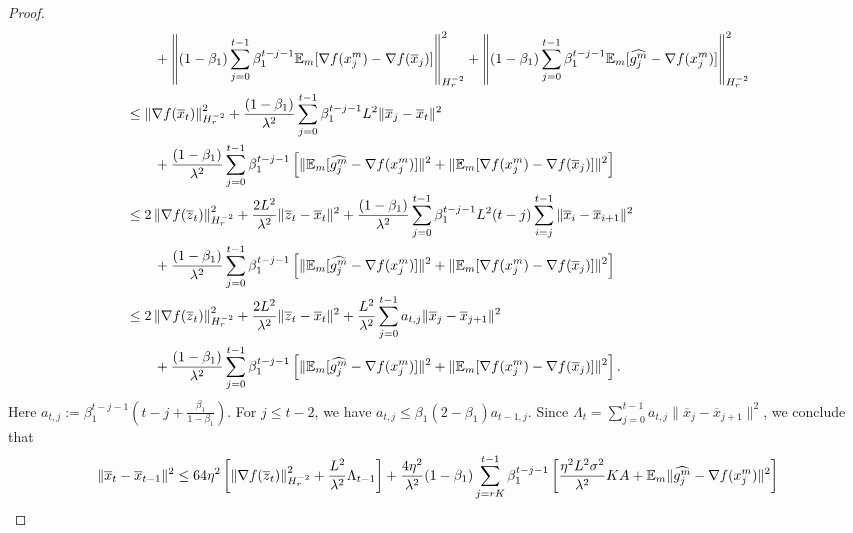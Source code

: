 \documentclass{article} %
\numberwithin{equation}{section}
\begin{document}
\begin{proof}
\begin{equation}
\begin{aligned}
            &\qquad +\left\|(1-\beta_1)\sum_{j=0}^{t-1}\beta_1^{t-j-1} \mathbb{E}_m [\nabla f(x_j^m) - \nabla f(\overline{x}_j)]\right\|_{H_r^{-2}}^2 + \left\|(1-\beta_1)\sum_{j=0}^{t-1}\beta_1^{t-j-1} \mathbb{E}_m [\widehat{g_j^m}-\nabla f(x_j^m)]\right\|_{H_r^{-2}}^2 \\
            &\leq \left\|\nabla f(\overline{x}_t)\right\|_{H_r^{-2}}^2 + \frac{(1-\beta_1)}{\lambda^2}\sum_{j=0}^{t-1}\beta_1^{t-j-1}L^2\|\overline{x}_j-\overline{x}_t\|^2 \\
            &\qquad + \frac{(1-\beta_1)}{\lambda^2}\sum_{j=0}^{t-1}\beta_1^{t-j-1}\left[ \| \mathbb{E}_m[\widehat{g_j^m}-\nabla f(x_j^m)] \|^2 + \|\mathbb{E}_m[\nabla f(x_j^m)-\nabla f(\overline{x}_j)] \|^2\right] \\
            &\leq 2\left\|\nabla f(\overline{z}_t)\right\|_{H_r^{-2}}^2 + \frac{2L^2}{\lambda^2}\|\overline{z}_t-\overline{x}_t\|^2 + \frac{(1-\beta_1)}{\lambda^2}\sum_{j=0}^{t-1}\beta_1^{t-j-1}L^2(t-j)\sum_{i=j}^{t-1}\|\overline{x}_i-\overline{x}_{i+1}\|^2 \\
            &\qquad + \frac{(1-\beta_1)}{\lambda^2}\sum_{j=0}^{t-1}\beta_1^{t-j-1}\left[ \| \mathbb{E}_m[\widehat{g_j^m}-\nabla f(x_j^m)] \|^2 + \|\mathbb{E}_m[\nabla f(x_j^m)-\nabla f(\overline{x}_j)] \|^2\right] \\
            &\leq 2\left\|\nabla f(\overline{z}_t)\right\|_{H_r^{-2}}^2 + \frac{2L^2}{\lambda^2}\|\overline{z}_t-\overline{x}_t\|^2 + \frac{L^2}{\lambda^2}\sum_{j=0}^{t-1}a_{t,j}\|\overline{x}_j-\overline{x}_{j+1}\|^2 \\
            &\qquad + \frac{(1-\beta_1)}{\lambda^2}\sum_{j=0}^{t-1}\beta_1^{t-j-1}\left[ \| \mathbb{E}_m[\widehat{g_j^m}-\nabla f(x_j^m)] \|^2 + \|\mathbb{E}_m[\nabla f(x_j^m)-\nabla f(\overline{x}_j)] \|^2\right].
        \end{aligned}
    \end{equation}
    Here $a_{t,j}:=\beta_1^{t-j-1}(t-j+\frac{\beta_1}{1-\beta_1})$. 
    For $j\leq t-2$, we have $a_{t,j}\leq \beta_1(2-\beta_1)a_{t-1,j}$. 
    Since $\Lambda_t=\sum_{j=0}^{t-1}a_{t,j}\|\overline{x}_j-\overline{x}_{j+1}\|^2$, we conclude that
    \begin{equation}\label{eq:8}
        \begin{aligned}
            \|\overline{x}_t-\overline{x}_{t-1}\|^2
            &\leq 64\eta^2\left[ \left\|\nabla f(\overline{z}_t)\right\|_{H_r^{-2}}^2 + \frac{L^2}{\lambda^2}\Lambda_{t-1}\right] + \frac{4\eta^2}{\lambda^2}(1-\beta_1)\sum_{j=rK}^{t-1}\beta_1^{t-j-1} \left[\frac{\eta^2L^2\sigma^2}{\lambda^2}KA+\expect_m\|\widehat{g_j^m}-\nabla f(x_j^m)\|^2\right] \\

\end{aligned}
\end{equation}
\end{proof}
\end{document}
